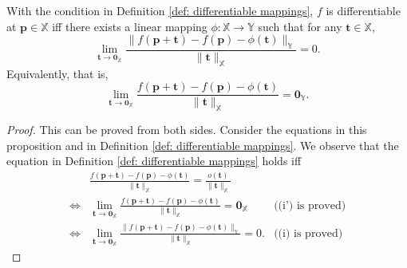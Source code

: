 \begin{lemma}
	With the condition in Definition \ref{def: differentiable mappings}, $f$ is differentiable at $\mathbf p \in \mathbb X$ iff there exists a linear mapping $\phi: \mathbb X \to \mathbb Y$ such that for any $\mathbf t \in \mathbb X$,
	\begin{equation}
		\tag{i}
		\lim_{\mathbf t \to \mathbf 0_{\mathbb X}} \frac{\| f(\mathbf p + \mathbf t) - f(\mathbf p) - \phi(\mathbf t) \|_{\mathbb Y}}{\| \mathbf t \|_{\mathbb X}} = 0.
	\end{equation}
	Equivalently, that is,
	\begin{equation}
		\tag{i'}
		\lim_{\mathbf t \to \mathbf 0_{\mathbb X}} \frac{ f(\mathbf p + \mathbf t) - f(\mathbf p) - \phi(\mathbf t) }{\| \mathbf t \|_{\mathbb X}} = \mathbf 0_{\mathbb Y}.
	\end{equation}
	
	\begin{proof}
		This can be proved from both sides. Consider the equations in this proposition and in Definition \ref{def: differentiable mappings}. We observe that the equation in Definition \ref{def: differentiable mappings} holds iff
		$$
		\begin{aligned}
			& \frac{f(\mathbf p + \mathbf t) - f(\mathbf p) - \phi(\mathbf t)}{\| \mathbf t \|_{\mathbb X}} = \frac{o(\mathbf t)}{\| \mathbf t \|_{\mathbb X}}\\
			\iff & \lim_{\mathbf t \to \mathbf 0_{\mathbb X}} \frac{f(\mathbf p + \mathbf t) - f(\mathbf p) - \phi(\mathbf t)}{\| \mathbf t \|_{\mathbb X}} = \mathbf 0_{\mathbb X} & \text{((i') is proved)} \\
			\iff & \lim_{\mathbf t \to \mathbf 0_{\mathbb X}} \frac{\| f(\mathbf p + \mathbf t) - f(\mathbf p) - \phi(\mathbf t)\|_{\mathbb Y}}{\| \mathbf t \|_{\mathbb X}} = 0. & \text{((i) is proved)}
		\end{aligned}
		$$
	\end{proof}
\end{lemma}



